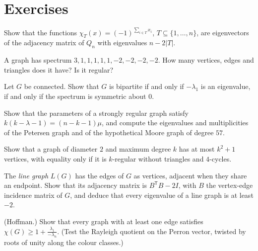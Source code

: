 \section{Exercises}

\begin{exercise}[$\star$]\label{ex:hypercube}
Show that the functions $\chi_T(x)=(-1)^{\sum_{i\in T}x_i}$, $T\subseteq\{1,\dots,n\}$, are eigenvectors of the adjacency matrix of
$Q_n$ with eigenvalues $n-2|T|$.
\end{exercise}

\begin{exercise}[$\star$]\label{ex:spectrumcount}
A graph has spectrum $3,1,1,1,1,1,-2,-2,-2,-2$. How many vertices, edges and triangles does it have? Is it regular?
\end{exercise}

\begin{exercise}[$\star\star$]\label{ex:bipartite}
Let $G$ be connected. Show that $G$ is bipartite if and only if $-\lambda_1$ is an eigenvalue, if and only if the spectrum is
symmetric about $0$.
\end{exercise}

\begin{exercise}[$\star$]\label{ex:srgcount}
Show that the parameters of a strongly regular graph satisfy $k(k-\lambda-1)=(n-k-1)\mu$, and compute the eigenvalues and
multiplicities of the Petersen graph and of the hypothetical Moore graph of degree $57$.
\end{exercise}

\begin{exercise}[$\star$]\label{ex:moorebound}
Show that a graph of diameter $2$ and maximum degree $k$ has at most $k^2+1$ vertices, with equality only if it is $k$-regular
without triangles and $4$-cycles.
\end{exercise}

\begin{exercise}[$\star\star$]\label{ex:linegraph}
The \emph{line graph} $L(G)$ has the edges of $G$ as vertices, adjacent when they share an endpoint. Show that its adjacency matrix
is $B^{\mathsf T}B-2I$, with $B$ the vertex-edge incidence matrix of $G$, and deduce that every eigenvalue of a line graph is at least
$-2$.
\end{exercise}

\begin{exercise}[$\star\star$]\label{ex:chromatic}
(Hoffman.) Show that every graph with at least one edge satisfies $\chi(G)\ge1+\frac{\lambda_1}{-\lambda_n}$. (Test the Rayleigh quotient on the
Perron vector, twisted by roots of unity along the colour classes.)
\end{exercise}

